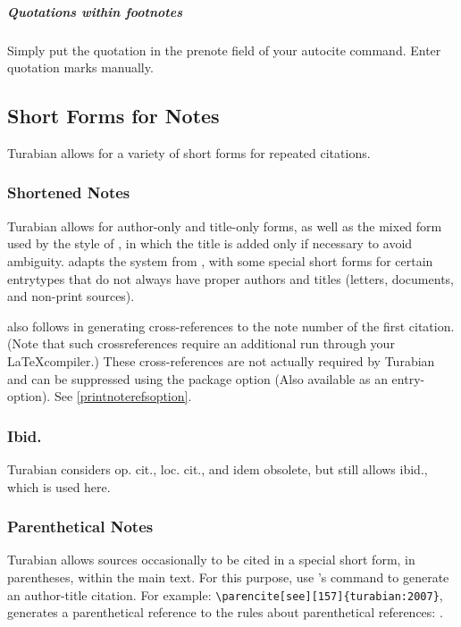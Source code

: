 \documentclass{ltxdockit}[2010/02/12]
\begin{document}
\subparagraph{Quotations within footnotes}
Simply put the quotation in the prenote field of your autocite command. Enter quotation marks manually.
\autocites[\enquote{Evolution is a change from a no-howish untalkaboutable all-alikeness to a somehowish and in general talkaboutable not-all-alikeness by continuous sticktogetherations and somethingelseifications,} William James, as quoted in][]{gerson1996re:-whence-a-sp}

\subsection{Short Forms for Notes}
Turabian allows for a variety of short forms for repeated citations. 

\subsubsection{Shortened Notes}
Turabian allows for author-only and title-only forms, as well as the mixed form used by the  style of , in which the title is added only if necessary to avoid ambiguity.
 adapts the system from  , with some special short forms for certain entrytypes that do not always have proper authors and titles (\eg letters, documents, and non-print sources).

 also follows  in generating cross-references to the note number of the first citation. (Note that such crossreferences require an additional run through your \LaTeX compiler.) These cross-references are not actually required by Turabian and can be suppressed using the package option  (Also available as an entry-option). See \ref{printnoterefsoption}.

\subsubsection{Ibid.}
Turabian considers op. cit., loc. cit., and idem obsolete, but still allows ibid., which is used here.

\subsubsection{Parenthetical Notes}
Turabian allows sources occasionally to be cited in a special short form, in parentheses, within the main text.
For this purpose, use 's  command to generate an author-title citation. For example: \verb|\parencite[see][157]{turabian:2007}|, generates a parenthetical reference to the rules about parenthetical references: \parencite[see][157]{turabian:2007}.
\end{document}
